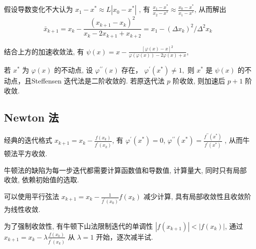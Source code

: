 \documentclass[10pt]{yerbaformat}
\begin{document}
\begin{definition}
    假设导数变化不大认为 $x_{1}-x^{*} \approx L\left|x_{0}-x^{*}\right|$ , 有 $\frac{x_{1}-x^{*}}{x_{2}-x^{*}} \approx \frac{x_{0}-x^{*}}{x_{1}-x^{*}}$, 从而解出 $$\bar{x}_{k+1}=x_{k}-\frac{\left(x_{k+1}-x_{k}\right)^{2}}{x_{k}-2 x_{k+1}+x_{k+2}}=x_{1}-\left(\Delta x_{k}\right)^{2} / \Delta^{2} x_{k}$$
\end{definition}

\begin{definition}
    结合上方的加速收敛法, 有 $\psi(x)=x-\frac{[\varphi(x)-x]^{2}}{\varphi(\varphi(x))-2 \varphi(x)+x}$,
\end{definition}

\begin{theorem}
    若 $x^{*}$ 为 $\varphi(x)$ 的不动点, 设 $\varphi^{\prime \prime}(x)$ 存在， $\varphi^{\prime}\left(x^{*}\right) \neq 1,$ 则 $x^{*}$ 是 $\psi(x)$ 的不动点，且Steffensen 迭代法是二阶收敛的. 若原迭代法 $p$ 阶收敛, 则加速后 $p+1$ 阶收敛.
\end{theorem}

\subsection{Newton 法}

\begin{definition}
    经典的迭代格式 $x_{k+1}=x_{k}-\frac{f\left(x_{k}\right)}{f^{\prime}\left(x_{k}\right)}$, 有 $\varphi^{\prime}\left(x^{*}\right)=0$, $\varphi^{\prime \prime}\left(x^{*}\right)=\frac{f^{\prime \prime}\left(x^{*}\right)}{f^{\prime}\left(x^{*}\right)}$ , 从而牛顿法平方收敛.
\end{definition}

\par 牛顿法的缺陷为每一步迭代都需要计算函数值和导数值, 计算量大, 同时只有局部收敛, 依赖初始值的选取.

\par 可以使用平行弦法 $x_{k+1}=x_{k}-\frac{1}{f^{\prime}\left(x_{0}\right)} f\left(x_{k}\right)$ 减少计算, 具有局部收敛性且收敛阶为线性收敛.

\begin{definition}
    为了强制收敛性, 有牛顿下山法限制迭代的单调性 $\left|f\left(x_{k+1}\right)\right|<\left|f\left(x_{k}\right)\right|$, 通过 $x_{k+1}=x_{k}-\lambda \frac{f\left(x_{k}\right)}{f^{\prime}\left(x_{k}\right)}$ 从 $\lambda = 1$ 开始，逐次减半试.
\end{definition}
\end{document}
